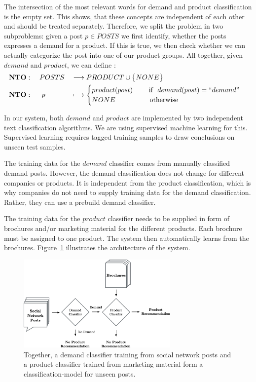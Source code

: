 The intersection of the most relevant words for demand and product classification is the empty set.
This shows, that these concepts are independent of each other and should be treated separately.
Therefore, we split the \nto problem in two subproblems: given a post $p \in POSTS$ we first identify, whether the posts expresses a demand for a product.
If this is true, we then check whether we can actually categorize the post into one of our product groups.
All together, given $demand$ and $product$, we can define \nto:
\begin{alignat*}{3}
  &\mathbf{NTO}: && ~POSTS && \longrightarrow PRODUCT \cup \big\{ NONE \big\} \\
  &\mathbf{NTO}: && ~~p   && \longmapsto \begin{cases}
	    product(post)~~~~~~~\text{if }~demand(post) = ``demand" \\
	    NONE~~~~~~~~~~~~~~~\text{otherwise}
   \end{cases}
\end{alignat*}

In our system, both $demand$ and $product$ are implemented by two independent text classification algorithms.
We are using supervised machine learning for this.
Supervised learning requires tagged training samples to draw conclusions on unseen test samples.

The training data for the $demand$ classifier comes from manually classified demand posts.
However, the demand classification does not change for different companies or products.
It is independent from the product classification, which is why companies do not need to supply training data for the demand classification.
Rather, they can use a prebuild demand classifier.

The training data for the $product$ classifier needs to be supplied in form of brochures and/or marketing material for the different products.
Each brochure must be assigned to one product.
The system then automatically learns from the brochures.
Figure~\ref{fig:workflow} illustrates the architecture of the system.

\begin{figure}
	\label{fig:workflow}
	\begin{center}
		\includegraphics[width=0.7\textwidth]{figures/nto_workflow.eps}
	\end{center}
	\caption{Together, a demand classifier training from social network posts and a product classifier trained from marketing material form a classification-model for unseen posts.}
\end{figure}


